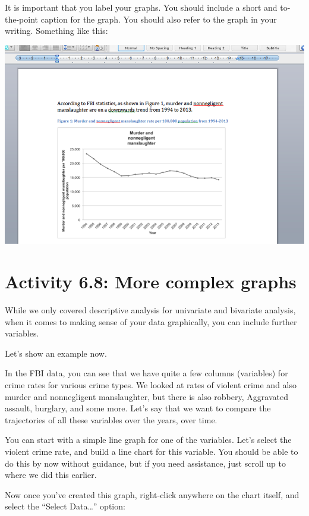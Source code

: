 \documentclass[
]{book}
\begin{document}
It is important that you label your graphs. You should include a short and to-the-point caption for the graph. You should also refer to the graph in your writing. Something like this:

\includegraphics{imgs/ref_and_caption.png}

\hypertarget{activity-6.8-more-complex-graphs}{%
\section{Activity 6.8: More complex graphs}\label{activity-6.8-more-complex-graphs}}

While we only covered descriptive analysis for univariate and bivariate analysis, when it comes to making sense of your data graphically, you can include further variables.

Let's show an example now.

In the FBI data, you can see that we have quite a few columns (variables) for crime rates for various crime types. We looked at rates of violent crime and also murder and nonnegligent manslaughter, but there is also robbery, Aggravated assault, burglary, and some more. Let's say that we want to compare the trajectories of all these variables over the years, over time.

You can start with a simple line graph for one of the variables. Let's select the violent crime rate, and build a line chart for this variable. You should be able to do this by now without guidance, but if you need assistance, just scroll up to where we did this earlier.

Now once you've created this graph, right-click anywhere on the chart itself, and select the ``Select Data\ldots{}'' option:
\end{document}
